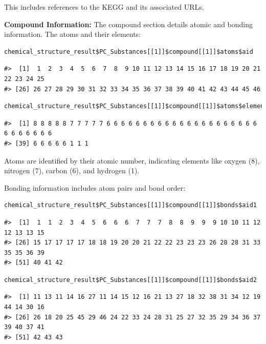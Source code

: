 This includes references to the KEGG and its associated URLs.

\textbf{Compound Information:}
The compound section details atomic and bonding information. The atoms and their elements:

\begin{verbatim}
chemical_structure_result$PC_Substances[[1]]$compound[[1]]$atoms$aid
\end{verbatim}

\begin{verbatim}
#>  [1]  1  2  3  4  5  6  7  8  9 10 11 12 13 14 15 16 17 18 19 20 21 22 23 24 25
#> [26] 26 27 28 29 30 31 32 33 34 35 36 37 38 39 40 41 42 43 44 45 46
\end{verbatim}

\begin{verbatim}
chemical_structure_result$PC_Substances[[1]]$compound[[1]]$atoms$element
\end{verbatim}

\begin{verbatim}
#>  [1] 8 8 8 8 8 7 7 7 7 7 6 6 6 6 6 6 6 6 6 6 6 6 6 6 6 6 6 6 6 6 6 6 6 6 6 6 6 6
#> [39] 6 6 6 6 6 1 1 1
\end{verbatim}

Atoms are identified by their atomic number, indicating elements like oxygen (8), nitrogen (7), carbon (6), and hydrogen (1).

Bonding information includes atom pairs and bond order:

\begin{verbatim}
chemical_structure_result$PC_Substances[[1]]$compound[[1]]$bonds$aid1
\end{verbatim}

\begin{verbatim}
#>  [1]  1  1  2  3  4  5  6  6  6  7  7  7  8  8  9  9  9 10 10 11 12 12 13 13 15
#> [26] 15 17 17 17 17 18 18 19 20 20 21 22 22 23 23 23 26 28 28 31 33 35 35 36 39
#> [51] 40 41 42
\end{verbatim}

\begin{verbatim}
chemical_structure_result$PC_Substances[[1]]$compound[[1]]$bonds$aid2
\end{verbatim}

\begin{verbatim}
#>  [1] 11 13 11 14 16 27 11 14 15 12 16 21 13 27 18 32 38 31 34 12 19 44 14 30 16
#> [26] 26 18 20 25 45 29 46 24 22 33 24 28 31 25 27 32 35 29 34 36 37 39 40 37 41
#> [51] 42 43 43
\end{verbatim}

